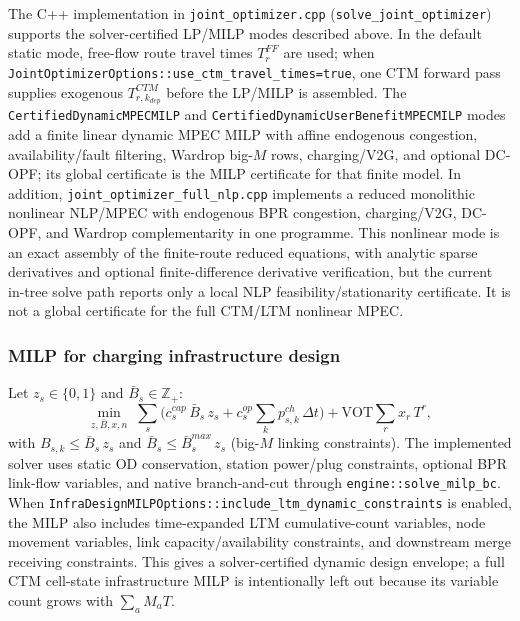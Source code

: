 \begin{remark}
  The C++ implementation in \texttt{joint\_optimizer.cpp}
  (\texttt{solve\_joint\_optimizer}) supports the solver-certified LP/MILP
  modes described above.  In the default static mode, free-flow route travel
  times $T^{FF}_r$ are used; when
  \texttt{JointOptimizerOptions::use\_ctm\_travel\_times=true}, one CTM
  forward pass supplies exogenous $T^{CTM}_{r,k_{dep}}$ before the LP/MILP is
  assembled.  The
  \texttt{CertifiedDynamicMPECMILP} and
  \texttt{CertifiedDynamicUserBenefitMPECMILP} modes add a finite linear
  dynamic MPEC MILP with affine endogenous congestion, availability/fault
  filtering, Wardrop big-\(M\) rows, charging/V2G, and optional DC-OPF; its
  global certificate is the MILP certificate for that finite model.  In
  addition, \texttt{joint\_optimizer\_full\_nlp.cpp} implements
  a reduced monolithic nonlinear NLP/MPEC with endogenous BPR congestion,
  charging/V2G, DC-OPF, and Wardrop complementarity in one programme.  This
  nonlinear mode is an exact assembly of the finite-route reduced equations,
  with analytic sparse derivatives and optional finite-difference derivative
  verification, but the current in-tree solve path reports only a local NLP
  feasibility/stationarity certificate.  It is not a global certificate for
  the full CTM/LTM nonlinear MPEC.
\end{remark}

\subsubsection{MILP for charging infrastructure design}
\label{sec:traffic-infra-milp}

Let $z_s \in \{0,1\}$ and $\bar{B}_s \in \mathbb{Z}_+$:
\begin{equation}
  \min_{z,\bar{B},x,n}\;
    \sum_s \bigl(c^{cap}_s\,\bar{B}_s\,z_s
               + c^{op}_s \sum_k p^{ch}_{s,k}\,\Delta t\bigr)
    + \mathrm{VOT} \sum_r x_r\,T^r,
  \label{eq:infra-milp-obj}
\end{equation}
with $B_{s,k} \le \bar{B}_s\,z_s$ and $\bar{B}_s \le \bar{B}^{max}_s\,z_s$
(big-$M$ linking constraints).  The implemented solver uses static OD
conservation, station power/plug constraints, optional BPR link-flow variables,
and native branch-and-cut through \texttt{engine::solve\_milp\_bc}.  When
\texttt{InfraDesignMILPOptions::include\_ltm\_dynamic\_constraints} is enabled,
the MILP also includes time-expanded LTM cumulative-count variables, node
movement variables, link capacity/availability constraints, and downstream
merge receiving constraints.  This gives a solver-certified dynamic design
envelope; a full CTM cell-state infrastructure MILP is intentionally left out
because its variable count grows with $\sum_a M_aT$.

